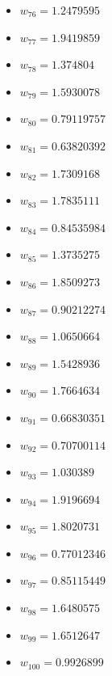 \documentclass[11pt]{article}
\begin{document}
\begin{itemize}
\item $w_{76} = 1.2479595$
\item $w_{77} = 1.9419859$
\item $w_{78} = 1.374804$
\item $w_{79} = 1.5930078$
\item $w_{80} = 0.79119757$
\item $w_{81} = 0.63820392$
\item $w_{82} = 1.7309168$
\item $w_{83} = 1.7835111$
\item $w_{84} = 0.84535984$
\item $w_{85} = 1.3735275$
\item $w_{86} = 1.8509273$
\item $w_{87} = 0.90212274$
\item $w_{88} = 1.0650664$
\item $w_{89} = 1.5428936$
\item $w_{90} = 1.7664634$
\item $w_{91} = 0.66830351$
\item $w_{92} = 0.70700114$
\item $w_{93} = 1.030389$
\item $w_{94} = 1.9196694$
\item $w_{95} = 1.8020731$
\item $w_{96} = 0.77012346$
\item $w_{97} = 0.85115449$
\item $w_{98} = 1.6480575$
\item $w_{99} = 1.6512647$
\item $w_{100} = 0.9926899$
\end{itemize}
\end{document}
